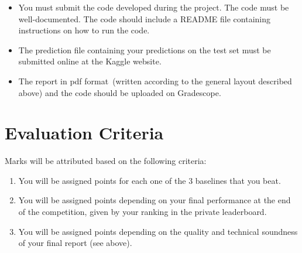 \documentclass[12pt]{article}
\begin{document}
\begin{itemize}
\item You must submit the code developed during the project.
The code must be well-documented.
The code should include a README file containing instructions on
how to run the code.
\item The prediction file containing your predictions on the test set must be submitted online at the Kaggle website.
\item  The report in pdf format~(written according to the general layout described above) and the code should be uploaded on Gradescope.
\end{itemize}


\section{Evaluation Criteria}


Marks will be attributed based on the following criteria:

\begin{enumerate}
    \item You will be assigned points for each one of the 3 baselines that you beat.
    \item You will be assigned points depending on your final performance at the end of the competition, given by your ranking in the private leaderboard.
    \item You will be assigned points depending on the quality and technical soundness of your final report (see above).
\end{enumerate}


\end{document}
